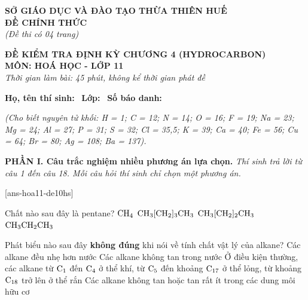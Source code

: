 \documentclass[12pt,a4paper]{article}
\begin{document}
\thispagestyle{firstpage}

\noindent
\begin{minipage}[t]{0.44\textwidth}
	\centering\fontsize{10pt}{12pt}\selectfont
	\textbf{SỞ GIÁO DỤC VÀ ĐÀO TẠO THỪA THIÊN HUẾ}\\
	\textbf{ĐỀ CHÍNH THỨC}\\
	\textit{(Đề thi có 04 trang)}
\end{minipage}\hfill
\begin{minipage}[t]{0.54\textwidth}
	\centering\fontsize{10.5pt}{13pt}\selectfont
	\textbf{ĐỀ KIỂM TRA ĐỊNH KỲ CHƯƠNG 4 (HYDROCARBON)}\\
	\textbf{MÔN: HOÁ HỌC - LỚP 11}\\
	\textit{Thời gian làm bài: 45 phút, không kể thời gian phát đề}
	
	\smallskip
\end{minipage}

\smallskip
\noindent\hrulefill
\smallskip

\noindent\textbf{Họ, tên thí sinh:} \dotfill\ \textbf{Lớp:} \dotfill\ \textbf{Số báo danh:} \dotfill

\smallskip
\noindent\textit{(Cho biết nguyên tử khối: H = 1; C = 12; N = 14; O = 16; F = 19; Na = 23; Mg = 24; Al = 27; P = 31; S = 32; Cl = 35,5; K = 39; Ca = 40; Fe = 56; Cu = 64; Br = 80; Ag = 108; Ba = 137).}
\smallskip

\noindent\textbf{\large PHẦN I. Câu trắc nghiệm nhiều phương án lựa chọn.}
\textit{Thí sinh trả lời từ câu 1 đến câu 18. Mỗi câu hỏi thí sinh chỉ chọn một phương án.}
\vspace{0.2cm}

[ans-hoa11-de10hs]

\begin{ex}
Chất nào sau đây là pentane?
\choice
{$\ce{CH4}$}
{\True $\ce{CH3[CH2]3CH3}$}
{$\ce{CH3[CH2]2CH3}$}
{$\ce{CH3CH2CH3}$}
\end{ex}

\begin{ex}
Phát biểu nào sau đây \textbf{không đúng} khi nói về tính chất vật lý của alkane?
\choice
{Các alkane đều nhẹ hơn nước}
{Các alkane không tan trong nước}
{Ở điều kiện thường, các alkane từ $\ce{C1}$ đến $\ce{C4}$ ở thể khí, từ $\ce{C5}$ đến khoảng $\ce{C17}$ ở thể lỏng, từ khoảng $\ce{C18}$ trở lên ở thể rắn}
{\True Các alkane không tan hoặc tan rất ít trong các dung môi hữu cơ}
\end{ex}
\end{document}
